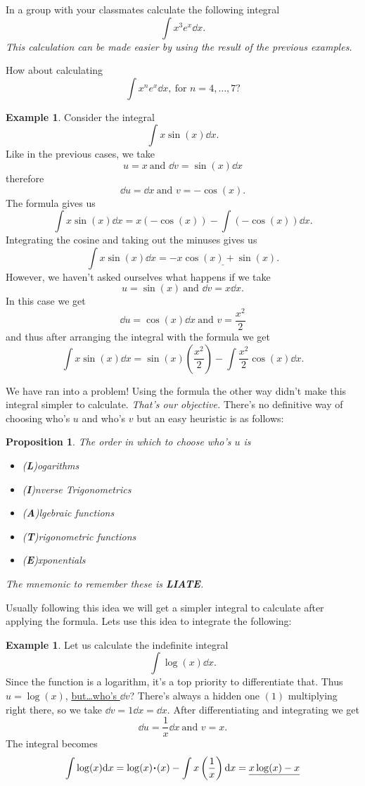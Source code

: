 \documentclass[12pt]{article}
\theoremstyle{plain}
\newtheorem{Prop}[Th]{Proposition}     %
\theoremstyle{definition}
\newtheorem{Ex}[Th]{Example}           %
\theoremstyle{remark}
\renewcommand{\:}{\colon}           %
\newcommand{\un}[1]{\underline{#1}}
\renewcommand{\.}{\Cdot}                %
\begin{document}
\begin{multicols}{2}
\begin{ptcbP}
In a group with your classmates calculate the following integral
$$\int x^3e^x\dd x.$$
\emph{This calculation can be made easier by using the result of the previous examples.}\par 
How about calculating 
$$\int x^ne^x\dd x,\ \text{for } n=4,\dots,7?$$
\end{ptcbP}

\begin{Ex}\label{ex:intxsinx}
  Consider the integral 
  $$\displaystyle \int x\sin(x)\dd x.$$
  Like in the previous cases, we take 
  $$u=x\ \text{and } \dd v=\sin(x)\dd x$$
  therefore
  $$\dd u=\dd x\ \text{and } v=-\cos(x).$$
  The formula gives us 
  $$\int x\sin(x)\dd x=x(-\cos(x))-\int (-\cos(x))\dd x.$$
  Integrating the cosine and taking out the minuses gives us 
  $$\int x\sin(x)\dd x=\un{-x\cos(x)+\sin(x)}.$$
  However, we haven't asked ourselves what happens if we take 
  $$u=\sin(x)\ \text{and } \dd v= x\dd x.$$
  In this case we get 
  $$\dd u=\cos(x)\dd x\ \text{and } v=\frac{x^2}{2}$$
  and thus after arranging the integral with the formula we get
  $$\int x\sin(x)\dd x=\sin(x)\left(\frac{x^2}{2}\right)-\int \frac{x^2}{2}\cos(x)\dd x.$$
\end{Ex}

We have ran into a problem! Using the formula the other way didn't make this integral simpler to calculate. \emph{That's our objective.} There's no definitive way of choosing who's $u$ and who's $v$ but an easy heuristic is as follows:

\begin{Prop}
The order in which to choose who's $u$ is 
  \begin{itemize}
    \itemsep=-0.4em
    \item (\textbf{L})ogarithms
    \item (\textbf{I})nverse Trigonometrics
    \item (\textbf{A})lgebraic functions
    \item (\textbf{T})rigonometric functions
    \item (\textbf{E})xponentials
  \end{itemize}
The mnemonic to remember these is \textbf{LIATE}.
\end{Prop}

Usually following this idea we will get a simpler integral to calculate after applying the formula. Lets use this idea to integrate the following:

\begin{Ex}
  Let us calculate the indefinite integral 
  $$\int \log(x)\dd x.$$
Since the function is a logarithm, it's a top priority to differentiate that. Thus $u=\log(x)$, \un{but\dots who's $\dd v$}? There's always a hidden one $(1)$ multiplying right there, so we take $\dd v=1\dd x=\dd x$. After differentiating and integrating we get
$$\dd u=\frac 1x\dd x\ \text{and } v=x.$$
The integral becomes
$$\int \log(x)\dd x=\log(x)\.(x)-\int x\left(\frac{1}{x}\right)\dd x=\un{x\log(x)-x}$$
\end{Ex}


\end{multicols}
\end{document}
